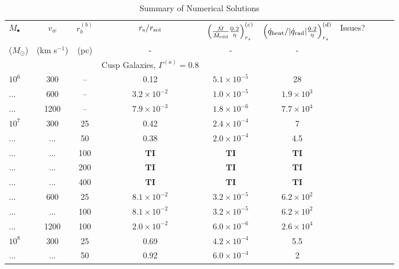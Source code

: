 \documentclass[usenatbib,fleqn]{mn2e}
\begin{document}
\begin{table}
\begin{threeparttable}
\begin{minipage}{18cm}
\caption{Summary of Numerical Solutions}
\begin{tabular}{lccccccccc}
  \hline
  {$M_{\bullet}$} & {$v_{w}$} & {$r_b^{(b)}$} &   $r_{\rm s}/r_{\rm soi}$ &  {$\left(\frac{\dot{M}}{\dot{M}_{\rm edd}}\frac{0.2}{\eta}\right)_{r_{s}}^{(c)}$} &
  {$\left(\dot{q}_{\rm heat}/|\dot{q}_{\rm rad}|\frac{0.2}{\eta}\right)_{r_s}^{(d)}$} & Issues? \\
  ($M_{\odot}$) & (km s$^{-1}$) & (pc) &- & - & - &  & \\ 
  \hline
  & & & Cusp Galaxies, $\Gamma^{(a)} = 0.8$ & & & & & \\
  $    10^{ 6 }$ & 300 & -- & 0.12 & $ 5.1 \times 10^{ -5 }$ & 28 \\
... & 600 & -- & $ 3.2 \times 10^{ -2 }$ & $ 1.0 \times 10^{ -5 }$ & $ 1.9 \times 10^{ 3 }$ \\
... & 1200 & -- & $ 7.9 \times 10^{ -3 }$ & $ 1.8 \times 10^{ -6 }$ & $ 7.7 \times 10^{ 4 }$ \\
$    10^{ 7 }$ & 300 & 25 & 0.42 & $ 2.4 \times 10^{ -4 }$ & 7 \\
... & ... & 50 & 0.38 & $ 2.0 \times 10^{ -4 }$ & 4.5 \\
... & ... & 100 & $\mathbf{TI}$ & $\mathbf{TI}$ & $\mathbf{TI}$ \\
... & ... & 200 & $\mathbf{TI}$ & $\mathbf{TI}$ & $\mathbf{TI}$ \\
... & ... & 400 & $\mathbf{TI}$ & $\mathbf{TI}$ & $\mathbf{TI}$ \\
... & 600 & 25 & $ 8.1 \times 10^{ -2 }$ & $ 3.2 \times 10^{ -5 }$ & $ 6.2 \times 10^{ 2 }$ \\
... & ... & 100 & $ 8.1 \times 10^{ -2 }$ & $ 3.2 \times 10^{ -5 }$ & $ 6.2 \times 10^{ 2 }$ \\
... & 1200 & 100 & $ 2.0 \times 10^{ -2 }$ & $ 6.0 \times 10^{ -6 }$ & $ 2.6 \times 10^{ 4 }$ \\
$    10^{ 8 }$ & 300 & 25 & 0.69 & $ 4.2 \times 10^{ -4 }$ & 5.5 \\
... & ... & 50 & 0.92 & $ 6.0 \times 10^{ -4 }$ & 2 \\

\end{tabular}
\end{minipage}
\end{threeparttable}
\end{table}
\end{document}
